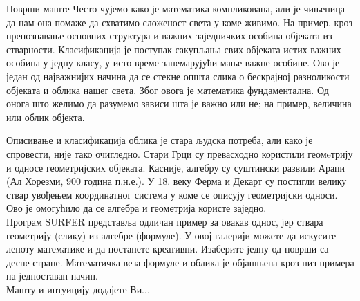 \begin{surferIntroPage}{Површи маште}
Често чујемо како је математика компликована, али је чињеница да нам она помаже да схватимо сложеност света у коме живимо. На пример, кроз препознавање основних структура и важних заједничких особина објеката из стварности. Класификација је поступак сакупљања свих објеката истих важних особина у једну класу, у исто време занемарујући мање важне особине. Ово је један од најважнијих начина да се стекне општа слика о бескрајној разноликости објеката и облика нашег света. Због овога је математика фундаментална. Од онога што желимо да разумемо зависи шта је важно или не; на пример, величина или облик објекта.
\\

\vspace{0.4cm}

Описивање и класификација облика је стара људска потреба, али како је спровести, није тако очигледно. Стари Грци су превасходно користили геомeтрију и односе геометријских објеката. Касније, алгебру су суштински развили Арапи (Ал Хорезми, 900 година п.н.е.). У 18. веку Ферма и Декарт су постигли велику ствар увођењем координатног система у коме се описују геометријски односи. Ово је омогућило да се алгебра и геометрија користе заједно.
\\
\vspace{0.4cm}
Програм SURFER представља одличан пример за овакав однос, јер ствара геометрију (слику) из алгебре (формуле).
У овој галерији можете да искусите лепоту математике и да постанете креативни. Изаберите једну од површи са десне стране. Математичка веза формуле и облика је објашњена кроз низ примера на једноставан начин.\\
Машту и интуицију додајете Ви...
\end{surferIntroPage}
